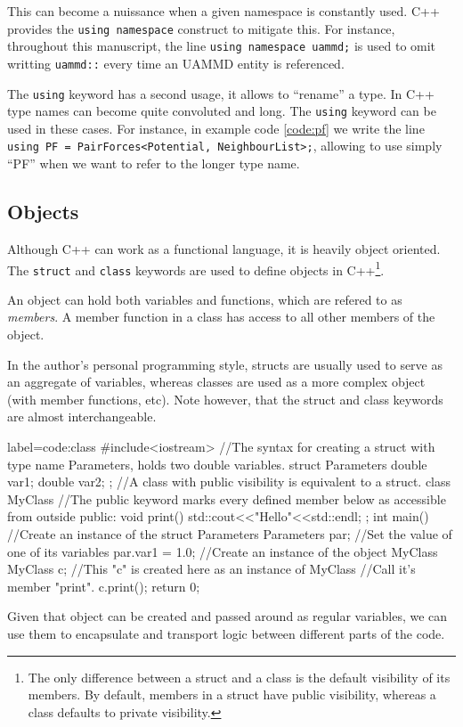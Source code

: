 \documentclass[ twoside,openright,titlepage,numbers=noenddot,%
headinclude,footinclude,cleardoublepage=empty,abstract=on,
BCOR=5mm,paper=a4,fontsize=11pt, dvipsnames
]{scrreprt}
\def\ucpp{uammd_cpp_lexer.py:UAMMDCppLexer -x}
\newcommand{\uammd}{\gls{UAMMD}\xspace}
\begin{document}
This can become a nuissance when a given namespace is constantly used. C++ provides the \texttt{using namespace} construct to mitigate this. For instance, throughout this manuscript, the line \texttt{using namespace uammd;} is used to omit writting \texttt{uammd::} every time an \uammd entity is referenced.

The \texttt{using} keyword has a second usage, it allows to ``rename'' a type. In C++ type names can become quite convoluted and long. The \texttt{using} keyword can be used in these cases. For instance, in example code \ref{code:pf} we write the line \texttt{using PF = PairForces<Potential, NeighbourList>;}, allowing to use simply ``PF'' when we want to refer to the longer type name.
\subsection*{Objects}
Although C++ can work as a functional language, it is heavily object oriented. The \texttt{struct} and \texttt{class} keywords are used to define objects in C++\footnote{The only difference between a struct and a class is the default visibility of its members. By default, members in a struct have public visibility, whereas a class defaults to private visibility.}.

An object can hold both variables and functions, which are refered to as \emph{members}. A member function in a class has access to all other members of the object.

In the author's personal programming style, structs are usually used to serve as an aggregate of variables, whereas classes are used as a more complex object (with member functions, etc). Note however, that the struct and class keywords are almost interchangeable.

\begin{code2} {label=code:class}
  #include<iostream>
  //The syntax for creating a struct with type name Parameters, holds two double variables.
  struct Parameters{
    double var1;
    double var2;    
  };
  //A class with public visibility is equivalent to a struct.
  class MyClass{
    //The public keyword marks every defined member below as accessible from outside
    public:
    void print(){
      std::cout<<"Hello"<<std::endl;
    }
  };
  int main(){
    //Create an instance of the struct Parameters
    Parameters par;
    //Set the value of one of its variables
    par.var1 = 1.0;
    //Create an instance of the object MyClass
    MyClass c;
    //This "c" is created here as an instance of MyClass
    //Call it's member "print".
    c.print();
    return 0;  
  }
\end{code2}
Given that object can be created and passed around as regular variables, we can use them to encapsulate and transport logic between different parts of the code.
\end{document}
